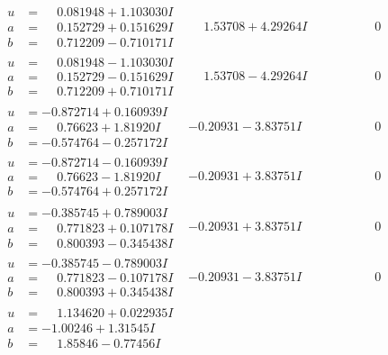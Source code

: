 \documentclass[1p]{elsarticle_modified}
\theoremstyle{definition}
\begin{document}
$$\begin{array}{c|c|c}
\begin{aligned}
u &= \phantom{-}0.081948 + 1.103030 I \\
a &= \phantom{-}0.152729 + 0.151629 I \\
b &= \phantom{-}0.712209 - 0.710171 I\end{aligned}
 & \phantom{-}1.53708 + 4.29264 I & \phantom{-0.000000 } 0 \\ \hline\begin{aligned}
u &= \phantom{-}0.081948 - 1.103030 I \\
a &= \phantom{-}0.152729 - 0.151629 I \\
b &= \phantom{-}0.712209 + 0.710171 I\end{aligned}
 & \phantom{-}1.53708 - 4.29264 I & \phantom{-0.000000 } 0 \\ \hline\begin{aligned}
u &= -0.872714 + 0.160939 I \\
a &= \phantom{-}0.76623 + 1.81920 I \\
b &= -0.574764 - 0.257172 I\end{aligned}
 & -0.20931 - 3.83751 I & \phantom{-0.000000 } 0 \\ \hline\begin{aligned}
u &= -0.872714 - 0.160939 I \\
a &= \phantom{-}0.76623 - 1.81920 I \\
b &= -0.574764 + 0.257172 I\end{aligned}
 & -0.20931 + 3.83751 I & \phantom{-0.000000 } 0 \\ \hline\begin{aligned}
u &= -0.385745 + 0.789003 I \\
a &= \phantom{-}0.771823 + 0.107178 I \\
b &= \phantom{-}0.800393 - 0.345438 I\end{aligned}
 & -0.20931 + 3.83751 I & \phantom{-0.000000 } 0 \\ \hline\begin{aligned}
u &= -0.385745 - 0.789003 I \\
a &= \phantom{-}0.771823 - 0.107178 I \\
b &= \phantom{-}0.800393 + 0.345438 I\end{aligned}
 & -0.20931 - 3.83751 I & \phantom{-0.000000 } 0 \\ \hline\begin{aligned}
u &= \phantom{-}1.134620 + 0.022935 I \\
a &= -1.00246 + 1.31545 I \\
b &= \phantom{-}1.85846 - 0.77456 I\end{aligned}

\end{array}$$
\end{document}
